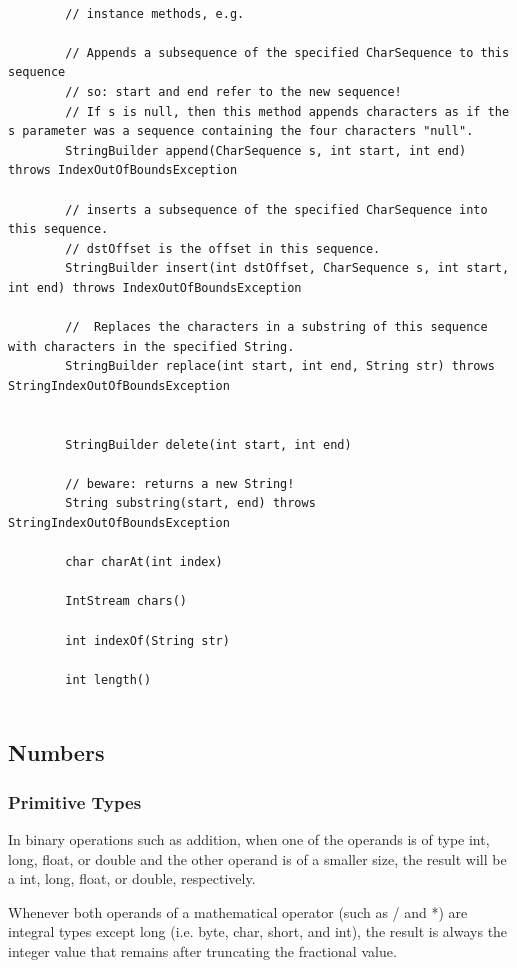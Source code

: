 \documentclass{scrartcl}
\begin{document}
    \begin{lstlisting}

        // instance methods, e.g.

        // Appends a subsequence of the specified CharSequence to this sequence
        // so: start and end refer to the new sequence!
        // If s is null, then this method appends characters as if the s parameter was a sequence containing the four characters "null".
        StringBuilder append(CharSequence s, int start, int end) throws IndexOutOfBoundsException

        // inserts a subsequence of the specified CharSequence into this sequence.
        // dstOffset is the offset in this sequence.
        StringBuilder insert(int dstOffset, CharSequence s, int start, int end) throws IndexOutOfBoundsException

        //  Replaces the characters in a substring of this sequence with characters in the specified String.
        StringBuilder replace(int start, int end, String str) throws StringIndexOutOfBoundsException


        StringBuilder delete(int start, int end)

        // beware: returns a new String!
        String substring(start, end) throws StringIndexOutOfBoundsException

        char charAt(int index)

        IntStream chars()

        int indexOf(String str)

        int length()


    \end{lstlisting}

\subsection{Numbers}
\subsubsection{Primitive Types}

In binary operations such as addition, when one of the operands is of type int, long, float, or double and the other operand is of a smaller size, the result will be a int, long, float, or double, respectively.

Whenever both operands of a mathematical operator (such as / and *) are integral types except long (i.e. byte, char, short, and int), the result is always the integer value that remains after truncating the fractional value.
\end{document}
